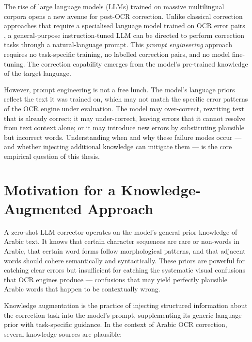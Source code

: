 The rise of large language models (LLMs) trained on massive multilingual
corpora opens a new avenue for post-OCR correction. Unlike classical
correction approaches that require a specialised language model trained
on OCR error pairs \cite{tong1996statistical}, a general-purpose
instruction-tuned LLM can be directed to perform correction tasks through
a natural-language prompt. This \emph{prompt engineering} approach requires
no task-specific training, no labelled correction pairs, and no model
fine-tuning. The correction capability emerges from the model's pre-trained
knowledge of the target language.

However, prompt engineering is not a free lunch. The model's language priors
reflect the text it was trained on, which may not match the specific error
patterns of the OCR engine under evaluation. The model may over-correct,
rewriting text that is already correct; it may under-correct, leaving errors
that it cannot resolve from text context alone; or it may introduce new
errors by substituting plausible but incorrect words. Understanding when and
why these failure modes occur --- and whether injecting additional knowledge
can mitigate them --- is the core empirical question of this thesis.

\section{Motivation for a Knowledge-Augmented Approach}
\label{sec:intro_motivation}

A zero-shot LLM corrector operates on the model's general prior knowledge
of Arabic text. It knows that certain character sequences are rare or
non-words in Arabic, that certain word forms follow morphological patterns,
and that adjacent words should cohere semantically and syntactically. These
priors are powerful for catching clear errors but insufficient for catching
the systematic visual confusions that OCR engines produce --- confusions that
may yield perfectly plausible Arabic words that happen to be contextually
wrong.

Knowledge augmentation is the practice of injecting structured information
about the correction task into the model's prompt, supplementing its
generic language prior with task-specific guidance. In the context of
Arabic OCR correction, several knowledge sources are plausible:

